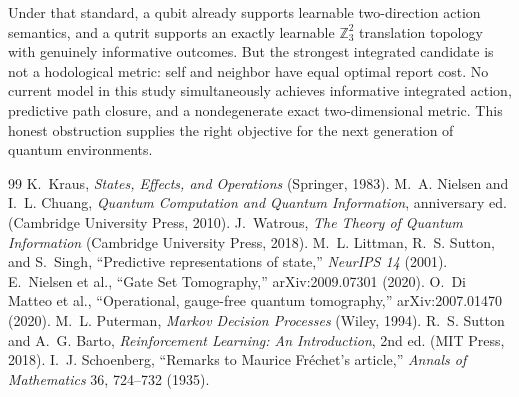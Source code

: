 \documentclass[11pt]{article}
\theoremstyle{definition}
\theoremstyle{remark}
\newcommand{\Z}{\mathbb Z}
\begin{document}
Under that standard, a qubit already supports learnable two-direction action
semantics, and a qutrit supports an exactly learnable $\Z_3^2$ translation
topology with genuinely informative outcomes.  But the strongest integrated
candidate is not a hodological metric: self and neighbor have equal optimal
report cost.  No current model in this study simultaneously achieves
informative integrated action, predictive path closure, and a nondegenerate
exact two-dimensional metric.  This honest obstruction supplies the right
objective for the next generation of quantum environments.

\begin{thebibliography}{99}
 K.~Kraus, \emph{States, Effects, and Operations}
(Springer, 1983).
 M.~A. Nielsen and I.~L. Chuang,
\emph{Quantum Computation and Quantum Information}, anniversary ed.
(Cambridge University Press, 2010).
 J.~Watrous, \emph{The Theory of Quantum Information}
(Cambridge University Press, 2018).
 M.~L. Littman, R.~S. Sutton, and S.~Singh,
``Predictive representations of state,'' \emph{NeurIPS 14} (2001).
 E.~Nielsen et al., ``Gate Set Tomography,''
arXiv:2009.07301 (2020).
 O.~Di Matteo et al., ``Operational, gauge-free quantum
tomography,'' arXiv:2007.01470 (2020).
 M.~L. Puterman, \emph{Markov Decision Processes}
(Wiley, 1994).
 R.~S. Sutton and A.~G. Barto,
\emph{Reinforcement Learning: An Introduction}, 2nd ed. (MIT Press, 2018).
 I.~J. Schoenberg, ``Remarks to Maurice Fr\'echet's
article,'' \emph{Annals of Mathematics} 36, 724--732 (1935).
\end{thebibliography}
\end{document}
